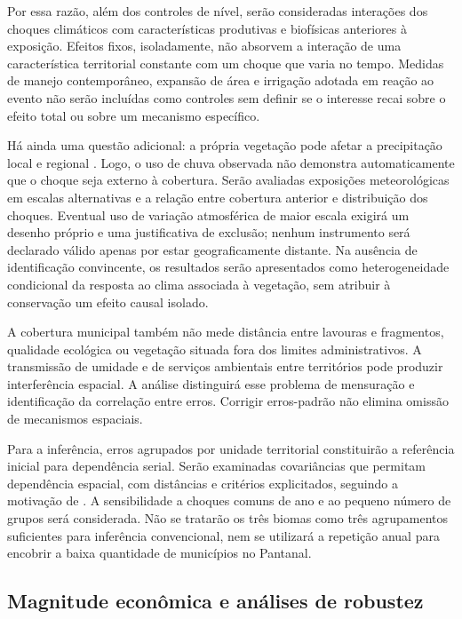 Por essa razão, além dos controles de nível, serão consideradas interações dos choques climáticos com características produtivas e biofísicas anteriores à exposição. Efeitos fixos, isoladamente, não absorvem a interação de uma característica territorial constante com um choque que varia no tempo. Medidas de manejo contemporâneo, expansão de área e irrigação adotada em reação ao evento não serão incluídas como controles sem definir se o interesse recai sobre o efeito total ou sobre um mecanismo específico.

Há ainda uma questão adicional: a própria vegetação pode afetar a precipitação local e regional \cite{SpracklenEtAl2012}. Logo, o uso de chuva observada não demonstra automaticamente que o choque seja externo à cobertura. Serão avaliadas exposições meteorológicas em escalas alternativas e a relação entre cobertura anterior e distribuição dos choques. Eventual uso de variação atmosférica de maior escala exigirá um desenho próprio e uma justificativa de exclusão; nenhum instrumento será declarado válido apenas por estar geograficamente distante. Na ausência de identificação convincente, os resultados serão apresentados como heterogeneidade condicional da resposta ao clima associada à vegetação, sem atribuir à conservação um efeito causal isolado.

A cobertura municipal também não mede distância entre lavouras e fragmentos, qualidade ecológica ou vegetação situada fora dos limites administrativos. A transmissão de umidade e de serviços ambientais entre territórios pode produzir interferência espacial. A análise distinguirá esse problema de mensuração e identificação da correlação entre erros. Corrigir erros-padrão não elimina omissão de mecanismos espaciais.

Para a inferência, erros agrupados por unidade territorial constituirão a referência inicial para dependência serial. Serão examinadas covariâncias que permitam dependência espacial, com distâncias e critérios explicitados, seguindo a motivação de . A sensibilidade a choques comuns de ano e ao pequeno número de grupos será considerada. Não se tratarão os três biomas como três agrupamentos suficientes para inferência convencional, nem se utilizará a repetição anual para encobrir a baixa quantidade de municípios no Pantanal.

\subsection{Magnitude econômica e análises de robustez}

